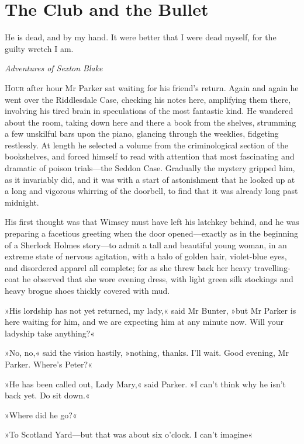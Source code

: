 


\chapter{The Club and the Bullet}

\epigraph{He is dead, and by my hand. It were better that I were dead myself, for the guilty wretch I am.}{\textit{Adventures of Sexton Blake}}


\lettrine[lines=4]{H}{our} after hour Mr Parker sat waiting for his friend's return. Again and again he went over the Riddlesdale Case, checking his notes here, amplifying them there, involving his tired brain in speculations of the most fantastic kind. He wandered about the room, taking down here and there a book from the shelves, strumming a few unskilful bars upon the piano, glancing through the weeklies, fidgeting restlessly.  At length he selected a volume from the criminological section of the bookshelves, and forced himself to read with attention that most fascinating and dramatic of poison trials—the Seddon Case. Gradually the mystery gripped him, as it invariably did, and it was with a start of astonishment that he looked up at a long and vigorous whirring of the doorbell, to find that it was already long past midnight.

His first thought was that Wimsey must have left his latchkey behind, and he was preparing a facetious greeting when the door opened—exactly as in the beginning of a Sherlock Holmes story—to admit a tall and beautiful young woman, in an extreme state of nervous agitation, with a halo of golden hair, violet-blue eyes, and disordered apparel all complete; for as she threw back her heavy travelling-coat he observed that she wore evening dress, with light green silk stockings and heavy brogue shoes thickly covered with mud.

»His lordship has not yet returned, my lady,« said Mr Bunter, »but Mr  Parker is here waiting for him, and we are expecting him at any minute now. Will your ladyship take anything?«

»No, no,« said the vision hastily, »nothing, thanks. I'll wait. Good evening, Mr Parker. Where's Peter?«

»He has been called out, Lady Mary,« said Parker. »I can't think why he isn't back yet. Do sit down.«

»Where did he go?«

»To Scotland Yard—but that was about six o'clock. I can't imagine\longdash«

